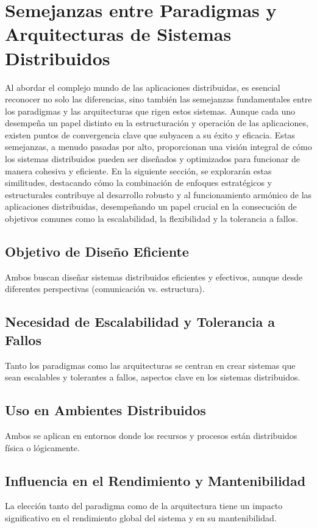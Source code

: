 \section{Semejanzas entre Paradigmas y Arquitecturas de Sistemas Distribuidos}
Al abordar el complejo mundo de las aplicaciones distribuidas, es esencial reconocer no solo las diferencias, sino también las semejanzas fundamentales entre los paradigmas y las arquitecturas que rigen estos sistemas. Aunque cada uno desempeña un papel distinto en la estructuración y operación de las aplicaciones, existen puntos de convergencia clave que subyacen a su éxito y eficacia. Estas semejanzas, a menudo pasadas por alto, proporcionan una visión integral de cómo los sistemas distribuidos pueden ser diseñados y optimizados para funcionar de manera cohesiva y eficiente. En la siguiente sección, se explorarán estas similitudes, destacando cómo la combinación de enfoques estratégicos y estructurales contribuye al desarrollo robusto y al funcionamiento armónico de las aplicaciones distribuidas, desempeñando un papel crucial en la consecución de objetivos comunes como la escalabilidad, la flexibilidad y la tolerancia a fallos.

\subsection{Objetivo de Diseño Eficiente}
Ambos buscan diseñar sistemas distribuidos eficientes y efectivos, aunque desde diferentes perspectivas (comunicación vs. estructura).

\subsection{Necesidad de Escalabilidad y Tolerancia a Fallos}
Tanto los paradigmas como las arquitecturas se centran en crear sistemas que sean escalables y tolerantes a fallos, aspectos clave en los sistemas distribuidos.

\subsection{Uso en Ambientes Distribuidos}
Ambos se aplican en entornos donde los recursos y procesos están distribuidos física o lógicamente.

\subsection{Influencia en el Rendimiento y Mantenibilidad}
La elección tanto del paradigma como de la arquitectura tiene un impacto significativo en el rendimiento global del sistema y en su mantenibilidad.

